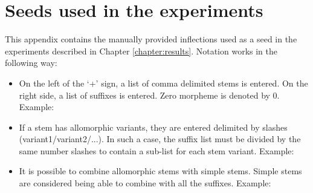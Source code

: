 \chapter{Seeds used in the experiments}\label{chapter:seeds}

This appendix contains the manually provided inflections used as a seed in the experiments described in Chapter \ref{chapter:results}. Notation works in the following way: \begin{itemize}
\item On the left of the `+' sign, a list of comma delimited stems is entered. On the right side, a list of suffixes is entered. Zero morpheme is denoted by 0. Example:
\begin{quote}
\end{quote}

\item If a stem has allomorphic variants, they are entered delimited by slashes (variant1/variant2/...). In such a case, the suffix list must be divided by the same number slashes to contain a sub-list for each stem variant. Example:
\begin{quote}
\end{quote} 

\item It is possible to combine allomorphic stems with simple stems. Simple stems are considered being able to combine with all the suffixes. Example: 
\begin{quote}
\end{quote}

\end{itemize}

